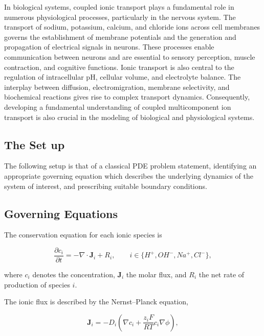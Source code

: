 \documentclass[11pt]{article}
\begin{document}
In biological systems, coupled ionic transport plays a 
fundamental role in numerous physiological processes, 
particularly in the nervous system. The transport of sodium, 
potassium, calcium, and chloride ions across cell membranes 
governs the establishment of membrane potentials and the 
generation and propagation of electrical signals in neurons. 
These processes enable communication between neurons and are 
essential to sensory perception, muscle contraction, and 
cognitive functions. Ionic transport is also central to the 
regulation of intracellular pH, cellular volume, and 
electrolyte balance. The interplay between diffusion, 
electromigration, membrane selectivity, and biochemical 
reactions gives rise to complex transport dynamics. 
Consequently, developing a fundamental understanding of 
coupled multicomponent ion transport is also crucial in the 
modeling of biological and physiological systems.

\subsection{The Set up}

The following setup is that of a classical PDE problem 
statement, identifying an appropriate governing equation 
which describes the underlying dynamics of the system of 
interest, and prescribing suitable boundary conditions.

\subsection*{Governing Equations}

The conservation equation for each ionic species is

\begin{equation}
    \frac{\partial c_i}{\partial t}
    = -\nabla\cdot\bm{J}_i + R_i,
    \qquad
    i \in \{H^+, OH^-, Na^+, Cl^-\},
    \label{eq:continuity}
\end{equation}

where $c_i$ denotes the concentration, $\bm{J}_i$
the molar flux, and $R_i$ the net rate of production
of species $i$.

The ionic flux is described by the Nernst--Planck
equation,

\begin{equation}
    \bm{J}_i
    = -D_i\left(
        \nabla c_i
        + \frac{z_i F}{RT}c_i\nabla\phi
    \right),
    \label{eq:nernst_planck}
\end{equation}
\end{document}
